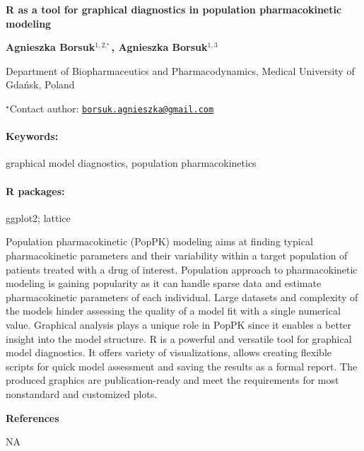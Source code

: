 \documentclass[11pt, a4paper]{article}
\renewcommand{\title}[1]{\begin{center}{\bf \LARGE #1}\end{center}}
\newcommand{\keywords}{\paragraph{Keywords:}}
\newcommand{\packages}{\paragraph{R packages:}}
\begin{document}
\pagestyle{empty}

\title{R as a tool for graphical diagnostics in population pharmacokinetic
modeling}

\begin{center}
  {\bf Agnieszka Borsuk$^{1, 2,^\star}$, Agnieszka Borsuk$^{1, 3}$}
\end{center}

\vskip 0.3cm

\begin{affiliations}
\begin{enumerate}
\begin{minipage}{0.915\textwidth}
\centering
\item Department of Biopharmaceutics and Pharmacodynamics, Medical University
of Gdańsk, Poland \\[-2pt]
\end{minipage}
\end{enumerate}
$^\star$Contact author: \href{mailto:borsuk.agnieszka@gmail.com}{\nolinkurl{borsuk.agnieszka@gmail.com}}\\
\end{affiliations}

\keywords graphical model diagnostics, population pharmacokinetics
\packages ggplot2; lattice

\vskip 0.8cm

Population pharmacokinetic (PopPK) modeling aims at finding typical
pharmacokinetic parameters and their variability within a target
population of patients treated with a drug of interest. Population
approach to pharmacokinetic modeling is gaining popularity as it can
handle sparse data and estimate pharmacokinetic parameters of each
individual. Large datasets and complexity of the models hinder assessing
the quality of a model fit with a single numerical value. Graphical
analysis plays a unique role in PopPK since it enables a better insight
into the model structure. R is a powerful and versatile tool for
graphical model diagnostics. It offers variety of visualizations, allows
creating flexible scripts for quick model assessment and saving the
results as a formal report. The produced graphics are publication-ready
and meet the requirements for most nonstandard and customized plots.

\textbf{References}

NA
\end{document}
